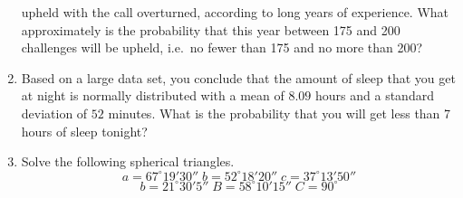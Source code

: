 \documentclass[11pt]{article}
\begin{document}
\begin{enumerate}
  upheld with the call overturned, according to long years of
  experience. What approximately is the probability that this year
  between 175 and 200 challenges will be upheld, i.e.\ no fewer than
  175 and no more than 200?
\item Based on a large data set, you conclude that the amount of sleep
   that you get at night is normally distributed with a mean of $8.09$ hours
   and a standard deviation of $52$ minutes. What is the probability
   that you will get less than 7 hours of sleep tonight?
 \item Solve the following spherical triangles.
   \begin{equation}
     \label{eq:isotufie}
     a=67^{\circ}19'30''\;{}b=52^{\circ}18'20''\;{}c=37^{\circ}13'50''
   \end{equation}
   \begin{equation}
     \label{eq:eizokaih}
     b=21^{\circ}30'5''\;{}B=58^{\circ}10'15''\;{}C=90^{\circ}
   \end{equation}
\end{enumerate}
\end{document}
